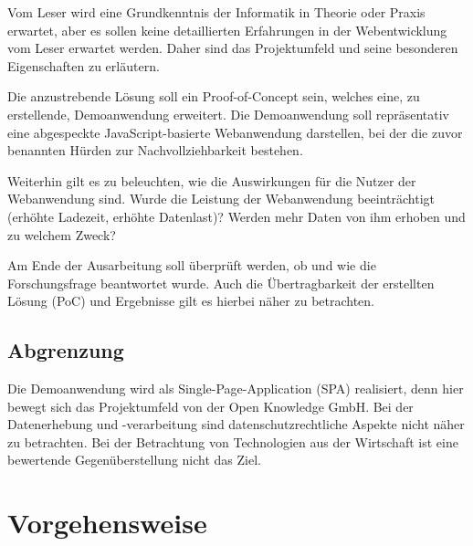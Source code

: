 Vom Leser wird eine Grundkenntnis der Informatik in Theorie oder Praxis erwartet, aber es sollen keine detaillierten Erfahrungen in der Webentwicklung vom Leser erwartet werden. Daher sind das Projektumfeld und seine besonderen Eigenschaften zu erläutern.

Die anzustrebende Lösung soll ein Proof-of-Concept sein, welches eine, zu erstellende, Demoanwendung erweitert. Die Demoanwendung soll repräsentativ eine abgespeckte JavaScript-basierte Webanwendung darstellen, bei der die zuvor benannten Hürden zur Nachvollziehbarkeit bestehen.

Weiterhin gilt es zu beleuchten, wie die Auswirkungen für die Nutzer der Webanwendung sind. Wurde die Leistung der Webanwendung beeinträchtigt (erhöhte Ladezeit, erhöhte Datenlast)? Werden mehr Daten von ihm erhoben und zu welchem Zweck?

Am Ende der Ausarbeitung soll überprüft werden, ob und wie die Forschungsfrage beantwortet wurde. Auch die Übertragbarkeit der erstellten Lösung (PoC) und Ergebnisse gilt es hierbei näher zu betrachten.

\subsection{Abgrenzung}


Die Demoanwendung wird als Single-Page-Application (SPA) \cite{SinglePageApplication} realisiert, denn hier bewegt sich das Projektumfeld von der Open Knowledge GmbH. Bei der Datenerhebung und -verarbeitung sind datenschutzrechtliche Aspekte nicht näher zu betrachten. Bei der Betrachtung von Technologien aus der Wirtschaft ist eine bewertende Gegenüberstellung nicht das Ziel.

\pagebreak

\section{Vorgehensweise}

\vspace{-0.25\baselineskip}

